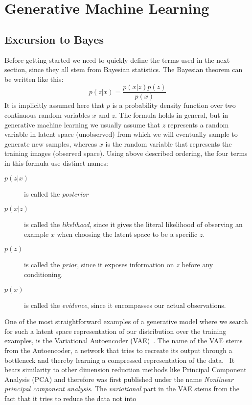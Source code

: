 \chapter{Generative Machine Learning}

\section{Excursion to Bayes}
Before getting started we need to quickly define the terms used in the next section, since they all stem from Bayesian
statistics. The Bayesian theorem can be written like this:
\begin{equation}
    p(z|x) = \frac{p(x|z)p(z)}{p(x)}
\end{equation}
It is implicitly assumed here that $p$ is a probability density function over two continuous random variables $x$ and $z$.
The formula holds in general, but in generative machine learning we usually assume that $z$ represents a random variable in
latent space (unobserved) from which we will eventually sample to generate new samples, whereas $x$ is the random variable that
represents the training images (observed space).
Using above described ordering, the four terms in this formula use distinct names:
\begin{description}
\item[$p(z|x)$] is called the \textit{posterior}
\item[$p(x|z)$] is called the \textit{likelihood}, since it gives the literal likelihood of observing an example $x$ when
choosing the latent space to be a specific $z$.
\item[$p(z)$] is called the \textit{prior}, since it exposes information on $z$ before any conditioning.
\item[$p(x)$] is called the \textit{evidence}, since it encompasses our actual observations.
\end{description}
One of the most straightforward examples of a generative model where we search for such a latent space representation of
our distribution over the training examples, is the Variational Autoencoder (VAE)~\cite{kingma2022autoencoding}. The name of the VAE stems from the Autoencoder,
a network that tries to recreate its output through a bottleneck and thereby learning a compressed representation of the data.~\autocite{https://doi.org/10.1002/aic.690370209}
It bears similarity to other dimension reduction methods like Principal Component Analysis (PCA) and therefore was first published under the name 
\textit{Nonlinear principal component analysis}. The \textit{variational} part in the VAE stems from the fact that it tries to reduce the data not into

